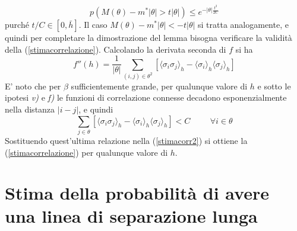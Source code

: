 \documentclass[aps,pre]{revtex4}
\newcommand{\beq}{\begin{equation}}
\newcommand{\eeq}{\end{equation}}
\begin{document}
\beq
p(M(\theta)-m^* |\theta| > t |\theta|) \leq  e^{-|\theta|\frac{t^2}{2C}}
\eeq
purch\'e $t/C \in [0,\bar h]$. Il caso $M(\theta)-m^* |\theta| < -t |\theta|$ si tratta analogamente, e quindi per completare la dimostrazione del lemma bisogna verificare la validit\`a della (\ref{stimacorrelazione}). Calcolando la derivata seconda di $f$ si ha
\beq
\label{stimacorr2}
f''(h)=\frac{1}{|\theta|} \sum_{(i,j) \in \theta^2} \left[ \langle \sigma_i \sigma_j \rangle_h - \langle \sigma_i \rangle_h \langle \sigma_j \rangle_h \right]
\eeq
E' noto \cite{GMM} che per $\beta$ sufficientemente grande, per qualunque valore di $h$  e sotto le ipotesi {\it v)} e {\it f)} le funzioni di correlazione connesse decadono esponenzialmente nella distanza $|i-j|$, e quindi
\beq
\sum_{j \in \theta}  \left[ \langle \sigma_i \sigma_j \rangle_h - \langle \sigma_i \rangle_h \langle \sigma_j \rangle_h \right] < C \hspace{1cm} \forall i \in \theta
\eeq
Sostituendo quest'ultima relazione nella (\ref{stimacorr2}) si ottiene la (\ref{stimacorrelazione}) per qualunque valore di $h$.

\section{Stima della probabilit\`a di avere una linea di separazione lunga}
\end{document}
